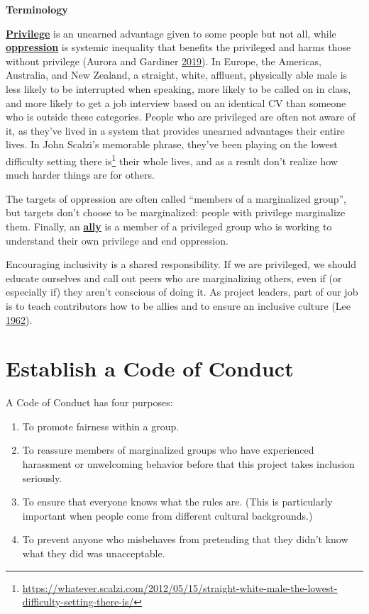 \documentclass[
]{krantz}
\providecommand{\tightlist}{%
  \setlength{\itemsep}{0pt}\setlength{\parskip}{0pt}}
\renewenvironment{quote}{\begin{VF}}{\end{VF}}
\renewcommand{\href}[2]{#2\footnote{\url{#1}}}
\newcommand{\gref}[2]{\hyperlink{#2}{\textbf{#1}}}
\begin{document}
\begin{quote}
\textbf{Terminology}

\gref{Privilege}{privilege} is an unearned advantage given to some people but not all,
while \gref{oppression}{oppression} is systemic inequality that benefits the privileged
and harms those without privilege (Aurora and Gardiner \protect\hyperlink{ref-Auro2019}{2019}).
In Europe, the Americas, Australia, and New Zealand,
a straight, white, affluent, physically able male
is less likely to be interrupted when speaking,
more likely to be called on in class,
and more likely to get a job interview based on an identical CV
than someone who is outside these categories.
People who are privileged are often not aware of it,
as they've lived in a system that provides unearned advantages their entire lives.
In John Scalzi's memorable phrase,
they've been playing on \href{https://whatever.scalzi.com/2012/05/15/straight-white-male-the-lowest-difficulty-setting-there-is/}{the lowest difficulty setting there is}
their whole lives,
and as a result don't realize how much harder things are for others.

The targets of oppression are often called ``members of a marginalized group'',
but targets don't choose to be marginalized:
people with privilege marginalize them.
Finally,
an \gref{ally}{ally} is a member of a privileged group
who is working to understand their own privilege and end oppression.
\end{quote}

Encouraging inclusivity is a shared responsibility.
If we are privileged,
we should educate ourselves and call out peers who are marginalizing others,
even if (or especially if) they aren't conscious of doing it.
As project leaders,
part of our job is to teach contributors how to be allies
and to ensure an inclusive culture (Lee \protect\hyperlink{ref-Lee1962}{1962}).

\hypertarget{teams-coc}{%
\section{Establish a Code of Conduct}\label{teams-coc}}

A Code of Conduct has four purposes:

\begin{enumerate}
\def\labelenumi{\arabic{enumi}.}
\tightlist
\item
  To promote fairness within a group.
\item
  To reassure members of marginalized groups
  who have experienced harassment or unwelcoming behavior before
  that this project takes inclusion seriously.
\item
  To ensure that everyone knows what the rules are.
  (This is particularly important when people come from different cultural backgrounds.)
\item
  To prevent anyone who misbehaves from pretending that
  they didn't know what they did was unacceptable.
\end{enumerate}
\end{document}
